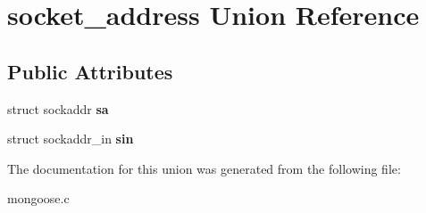 \hypertarget{unionsocket__address}{\section{socket\-\_\-address Union Reference}
\label{unionsocket__address}
}
\subsection*{Public Attributes}
\begin{DoxyCompactItemize}
\item 
\hypertarget{unionsocket__address_ab6a9b0bc545e839df7e06e5b6bff0891}{struct sockaddr {\bfseries sa}}\label{unionsocket__address_ab6a9b0bc545e839df7e06e5b6bff0891}

\item 
\hypertarget{unionsocket__address_af540a7224ea459c48bc6ec1ca592e55d}{struct sockaddr\-\_\-in {\bfseries sin}}\label{unionsocket__address_af540a7224ea459c48bc6ec1ca592e55d}

\end{DoxyCompactItemize}


The documentation for this union was generated from the following file\-:\begin{DoxyCompactItemize}
\item 
mongoose.\-c\end{DoxyCompactItemize}
